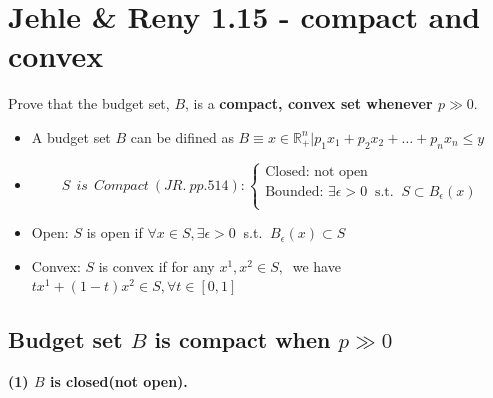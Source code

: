 \documentclass{article}
\newcommand{\R}{\mathbb{R}}
\begin{document}
\vspace{2mm}

\section{Jehle \& Reny 1.15 - compact and convex}
Prove that the budget set, $B$, is a \textbf{compact, convex set whenever $p \gg 0$}.

\begin{mdframed}[backgroundcolor=blue!20,linecolor=white]
\begin{itemize}
\item A budget set $B$ can be difined as $B \equiv {x \in \R^n_+ | p_1x_1 + p_2x_2 + \ldots + p_nx_n \le y}$
\item \begin{equation}
 S \  \ is \ \ Compact \ (JR. \ pp. 514):
    \begin{cases}
      \text{Closed: not open}\\
      \text{Bounded: $\exists \epsilon > 0 \ $ s.t. $\ S \subset B_{\epsilon}(x)$}\\
    \end{cases}
    \nonumber     
\end{equation}

\item Open:  $S$ is open if $\forall x \in S, \exists \epsilon > 0 \ $ s.t. $\ B_{\epsilon}(x) \subset S$ \\
\item Convex: $S$ is convex if for any $x^1, x^2 \in S,\ $ we have $tx^1 + (1-t)x^2 \in S, \forall t \in [0,1]$
\end{itemize}
\end{mdframed}

\subsection{Budget set $B$ is compact when $p \gg 0$}

\textbf{(1) $B$ is closed(not open).}


{\centering
{}
\label{fig:1_15_close}}
\end{document}
